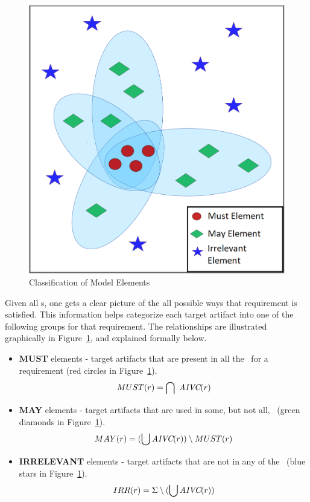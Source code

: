 \begin{figure}[htb]
\begin{center}
\includegraphics[scale=0.33]{figs/may_must_1.png}
\caption{Classification of Model Elements}\label{fig:maymust}
\end{center}
\end{figure}

Given all \mivc s, one gets a clear picture of the all possible ways that requirement is satisfied. This information helps categorize each target artifact into one of the following groups for that requirement.  The relationships are illustrated graphically in Figure~\ref{fig:maymust}, and explained formally below.
\begin{itemize}
  \item \textbf{MUST} elements - target artifacts that are present in all the \mivcs\ for a requirement (red circles in Figure~\ref{fig:maymust}).
      $$ MUST (r) = \bigcap \ \textit{AIVC}(r) $$

  \item \textbf{MAY} elements - target artifacts that are used in some, but not all, \mivcs\ (green diamonds in Figure~\ref{fig:maymust}).
      $$MAY(r) = (\bigcup \textit{AIVC}(r)) \setminus MUST (r) $$

  \item \textbf{IRRELEVANT} elements - target artifacts that are not in any of the \mivcs\ (blue stars in Figure~\ref{fig:maymust}). $$IRR(r) = \Sigma \setminus (\bigcup \textit{AIVC}(r))$$
\end{itemize}

